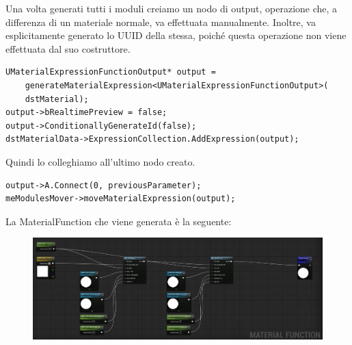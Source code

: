 \documentclass[main.tex]{subfiles}
\begin{document}
Una volta generati tutti i moduli creiamo un nodo di output, operazione che, a differenza di un materiale normale, va effettuata manualmente. Inoltre, va esplicitamente generato lo UUID della stessa, poiché questa operazione non viene effettuata dal suo costruttore. 
\begin{lstlisting}
UMaterialExpressionFunctionOutput* output =
    generateMaterialExpression<UMaterialExpressionFunctionOutput>(
    dstMaterial);
output->bRealtimePreview = false;
output->ConditionallyGenerateId(false);
dstMaterialData->ExpressionCollection.AddExpression(output);
\end{lstlisting}
Quindi lo colleghiamo all'ultimo nodo creato.
\begin{lstlisting}
output->A.Connect(0, previousParameter);
meModulesMover->moveMaterialExpression(output);
\end{lstlisting}
\clearpage
La MaterialFunction che viene generata è la seguente:
\begin{figure}[H]
    \centering
    \includegraphics[width=1\linewidth]{img/renderingPipeline/GeneratedPipelineFull.jpg}
    \label{fig:2_generatedMFpipeline}
\end{figure}
\end{document}
